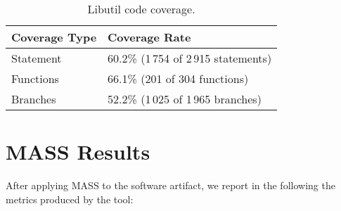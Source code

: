 \begin{table}[h]
\centering
\scriptsize
\begin{tabular}{|l|l|}
\hline
\textbf{Coverage Type} & \textbf{Coverage Rate} \\
\hline
Statement     & 60.2\% (1\,754 of 2\,915 statements)\\
Functions     & 66.1\% (201 of 304 functions)\\
Branches      & 52.2\% (1\,025 of 1\,965 branches)\\
\hline
\end{tabular}
\caption{Libutil code coverage.}
\label{table:gslibutil_coverage}
\end{table}





\section{MASS Results}

After applying MASS to the software artifact, we report in the following the metrics produced by the tool:

